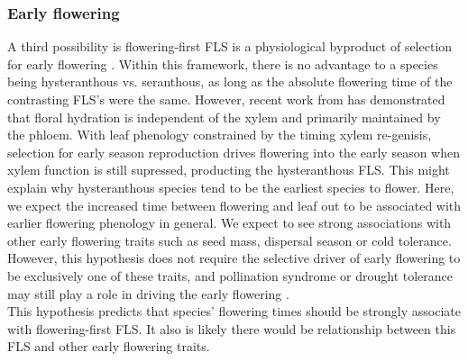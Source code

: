 \documentclass[12pt]{article}\usepackage[]{graphicx}\usepackage[]{color}
\begin{document}
\subsubsection*{Early flowering}
\indent\indent A third possibility is flowering-first FLS is a physiological byproduct of selection for early flowering \citep{Primack1987}. %
Within this framework, there is no advantage to a species being hysteranthous vs. seranthous, as long as the absolute flowering time of the contrasting FLS's were the same. %
However, recent work from \citet{Savage2019} has demonstrated that floral hydration is independent of the xylem and primarily maintained by the phloem. With leaf phenology constrained by the timing xylem re-genisis, selection for early season reproduction drives flowering into the early season when xylem function is still supressed, producting the hysteranthous FLS. This might explain why hysteranthous species tend to be the earliest species to flower. Here, we expect the increased time between flowering and leaf out to be associated with earlier flowering phenology in general. We expect to see strong associations with other early flowering traits such as seed mass, dispersal season or cold tolerance. However, this hypothesis does not require the selective driver of early flowering to be exclusively one of these traits, and pollination syndrome or drought tolerance may still play a role in driving the early flowering \citep{Savage2019}.\\
\indent This hypothesis predicts that species' flowering times should be strongly associate with flowering-first FLS. It also is likely there would be relationship between this FLS and other early flowering traits.
\end{document}
